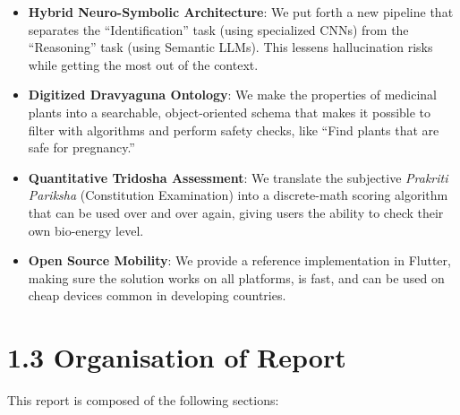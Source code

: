 \documentclass[12pt]{article}
\begin{document}
\begin{itemize}
    \item \textbf{Hybrid Neuro-Symbolic Architecture}: We put forth a new pipeline that separates
    the ``Identification'' task (using specialized CNNs) from the ``Reasoning'' task (using Semantic
    LLMs). This lessens hallucination risks while getting the most out of the context.

    \item \textbf{Digitized Dravyaguna Ontology}: We make the properties of medicinal plants into
    a searchable, object-oriented schema that makes it possible to filter with algorithms and
    perform safety checks, like ``Find plants that are safe for pregnancy.''

    \item \textbf{Quantitative Tridosha Assessment}: We translate the subjective
    \textit{Prakriti Pariksha} (Constitution Examination) into a discrete-math scoring algorithm
    that can be used over and over again, giving users the ability to check their own bio-energy
    level.

    \item \textbf{Open Source Mobility}: We provide a reference implementation in Flutter, making
    sure the solution works on all platforms, is fast, and can be used on cheap devices common in
    developing countries.
\end{itemize}

\newpage

\section*{1.3 \quad Organisation of Report}
\justify

This report is composed of the following sections:
\end{document}
